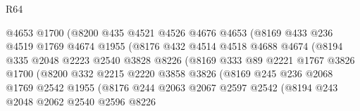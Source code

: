 \begin{lexlean}{R64}
\begin{coremodule}
                            @4653
                            @1700
                            (@8200
                              @435
                              @4521
                              @4526
                              @4676
                              @4653
                              (@8169
                                @433
                                @236
                                @4519
                                @1769
                                @4674
                                @1955
                                (@8176
                                  @432
                                  @4514
                                  @4518
                                  @4688
                                  @4674
                                  (@8194
                                    @335
                                    @2048
                                    @2223
                                    @2540
                                    @3828
                                    @8226
                                    (@8169
                                      @333
                                      @89
                                      @2221
                                      @1767
                                      @3826
                                      @1700
                                      (@8200
                                        @332
                                        @2215
                                        @2220
                                        @3858
                                        @3826
                                        (@8169
                                          @245
                                          @236
                                          @2068
                                          @1769
                                          @2542
                                          @1955
                                          (@8176
                                            @244
                                            @2063
                                            @2067
                                            @2597
                                            @2542
                                            (@8194
                                              @243
                                              @2048
                                              @2062
                                              @2540
                                              @2596
                                              @8226

\end{coremodule}
\end{lexlean}
